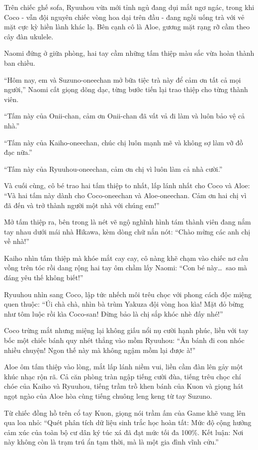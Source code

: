 ﻿\documentclass[../main.tex]{subfiles}
\begin{document}
Trên chiếc ghế sofa, Ryuuhou vừa mới tỉnh ngủ đang dụi mắt ngơ ngác, trong khi Coco - vẫn đội nguyên chiếc vòng hoa dại trên đầu - đang ngồi uống trà với vẻ mặt cực kỳ hiền lành khác lạ. Bên cạnh cô là Aloe, gương mặt rạng rỡ cầm theo cây đàn ukulele.

Naomi đứng ở giữa phòng, hai tay cầm những tấm thiệp màu sắc vừa hoàn thành ban chiều.

``Hôm nay, em và Suzuno-oneechan mở bữa tiệc trà này để cảm ơn tất cả mọi người,'' Naomi cất giọng dõng dạc, từng bước tiến lại trao thiệp cho từng thành viên.

``Tấm này của Onii-chan, cảm ơn Onii-chan đã vất vả đi làm và luôn bảo vệ cả nhà.''

``Tấm này của Kaiho-oneechan, chúc chị luôn mạnh mẽ và không sợ làm vỡ đồ đạc nữa.''

``Tấm này của Ryuuhou-oneechan, cảm ơn chị vì luôn làm cả nhà cười.''

Và cuối cùng, cô bé trao hai tấm thiệp to nhất, lấp lánh nhất cho Coco và Aloe: ``Và hai tấm này dành cho Coco-oneechan và Aloe-oneechan. Cảm ơn hai chị vì đã đến và trở thành người một nhà với chúng em!''

Mở tấm thiệp ra, bên trong là nét vẽ ngộ nghĩnh hình tám thành viên đang nắm tay nhau dưới mái nhà Hikawa, kèm dòng chữ nắn nót: ``Chào mừng các anh chị về nhà!''

Kaiho nhìn tấm thiệp mà khóe mắt cay cay, cô nàng khẽ chạm vào chiếc nơ cầu vồng trên tóc rồi dang rộng hai tay ôm chầm lấy Naomi: ``Con bé này\dots\ sao mà đáng yêu thế không biết!''

Ryuuhou nhìn sang Coco, lập tức nhếch môi trêu chọc với phong cách độc miệng quen thuộc: ``Úi chà chà, nhìn bà trùm Yakuza đội vòng hoa kìa! Mặt đỏ bừng như tôm luộc rồi kìa Coco-san! Đừng bảo là chị sắp khóc nhè đấy nhé!''

Coco trừng mắt nhưng miệng lại không giấu nổi nụ cười hạnh phúc, liền với tay bốc một chiếc bánh quy nhét thẳng vào mồm Ryuuhou: ``Ăn bánh đi con nhóc nhiều chuyện! Ngon thế này mà không ngậm mồm lại được à!''

Aloe ôm tấm thiệp vào lòng, mắt lấp lánh niềm vui, liền cầm đàn lên gảy một khúc nhạc rộn rã. Cả căn phòng tràn ngập tiếng cười đùa, tiếng trêu chọc chí chóe của Kaiho và Ryuuhou, tiếng trầm trồ khen bánh của Kuon và giọng hát ngọt ngào của Aloe hòa cùng tiếng chuông leng keng từ tay Suzuno.

Từ chiếc đồng hồ trên cổ tay Kuon, giọng nói trầm ấm của Game khẽ vang lên qua loa nhỏ: ``Quét phân tích dữ liệu sinh trắc học hoàn tất: Mức độ cộng hưởng cảm xúc của toàn bộ cư dân ký túc xá đã đạt mức tối đa 100\%. Kết luận: Nơi này không còn là trạm trú ẩn tạm thời, mà là một gia đình vĩnh cửu.''
\end{document}
